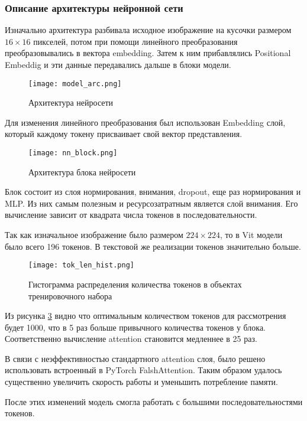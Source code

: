\documentclass[../part_2.tex]{subfiles}
\begin{document}
    \subsubsection{Описание архитектуры нейронной сети}
    \par Изначально архитектура разбивала исходное изображение на кусочки размером $16\times16$ пикселей, потом при помощи линейного преобразования преобразовывались в вектора embedding. Затем к ним прибавлялись Positional Embeddig и эти данные передавались дальше в блоки модели.
    \begin{figure}[H]
        \centering
        \texttt{[image: model\_arc.png]}
        \caption{Архитектура нейросети}
        \label{fig:model_arc}
    \end{figure}
    \par Для изменения линейного преобразования был использован Embedding слой, который каждому токену присваивает свой вектор представления.
    \begin{figure}[H]
        \centering
        \texttt{[image: nn\_block.png]}
        \caption{Архитектура блока нейросети}
        \label{fig:nn_block}
    \end{figure}
    \par Блок состоит из слоя нормирования, внимания, dropout, еще раз нормирования и MLP. Из них самым полезным и ресурсозатратным является слой внимания. Его вычисление зависит от квадрата числа токенов в последовательности.
    \par Так как изначальное изображение было размером $224\times224$, то в Vit модели было всего 196 токенов. В текстовой же реализации токенов значительно больше.
    \begin{figure}[H]
        \centering
        \texttt{[image: tok\_len\_hist.png]}
        \caption{Гистограмма распределения количества токенов в объектах тренировочного набора}
        \label{fig:tok_len_hist}
    \end{figure}
    \par Из рисунка \ref{fig:tok_len_hist} видно что оптимальным количеством токенов для рассмотрения будет 1000, что в 5 раз больше привычного количества токенов у блока. Соответственно вычисление attention становится медленнее в 25 раз.
    \par В связи с неэффективностью стандартного attention слоя, было решено использовать встроенный в PyTorch FalshAttention\cite{dao2022flashattentionfastmemoryefficientexact}. Таким образом удалось существенно увеличить скорость работы и уменьшить потребление памяти.
    \par После этих изменений модель смогла работать с большими последовательностями токенов.
\end{document}
